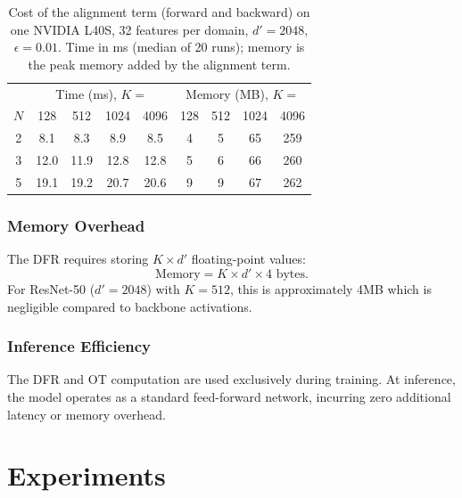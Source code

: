 \documentclass[preprint,12pt]{elsarticle}
\providecommand{\DIFadd}[1]{{\protect\color{blue} \sf #1}} %
\providecommand{\DIFaddbegin}{} %
\providecommand{\DIFaddend}{} %
\providecommand{\DIFaddFL}[1]{\DIFadd{#1}} %
\newcommand{\DIFaddincludegraphics}[2][]{{\color{blue}\fbox{\DIFOincludegraphics[#1]{#2}}}} %
\DeclareRobustCommand{\DIFaddbegin}{\DIFOaddbegin \let\includegraphics\DIFaddincludegraphics} %
\DeclareRobustCommand{\DIFaddend}{\DIFOaddend \let\includegraphics\DIFOincludegraphics} %
\begin{document}
\DIFaddbegin \begin{table}[t]
\caption{\DIFaddFL{Cost of the alignment term (forward and backward) on one NVIDIA L40S, 32 features per domain, $d'=2048$, $\epsilon=0.01$. Time in ms (median of 20 runs); memory is the peak memory added by the alignment term.}}
\label{tab:scalability}
\centering
\small
\begin{tabular}{c|cccc|cccc}
\toprule
 & \multicolumn{4}{c|}{Time (ms), $K=$} & \multicolumn{4}{c}{Memory (MB), $K=$} \\
$N$ & 128 & 512 & 1024 & 4096 & 128 & 512 & 1024 & 4096 \\
\midrule
2 & 8.1 & 8.3 & 8.9 & 8.5 & 4 & 5 & 65 & 259 \\
3 & 12.0 & 11.9 & 12.8 & 12.8 & 5 & 6 & 66 & 260 \\
5 & 19.1 & 19.2 & 20.7 & 20.6 & 9 & 9 & 67 & 262 \\
\bottomrule
\end{tabular}
\end{table}

\DIFaddend \subsubsection{Memory Overhead}

The DFR requires storing $K \times d'$ floating-point values:
\begin{equation}
    \text{Memory} = K \times d' \times 4 \text{ bytes}.
\end{equation}
For ResNet-50 ($d' = 2048$) with $K = 512$, this is approximately 4MB which is negligible compared to backbone activations.

\subsubsection{Inference Efficiency}

The DFR and OT computation are used exclusively during training. At inference, the model operates as a standard feed-forward network, incurring zero additional latency or memory overhead. \section{Experiments}
\label{sec:experiments}

\pgfplotsset{compat=1.17}
\end{document}
